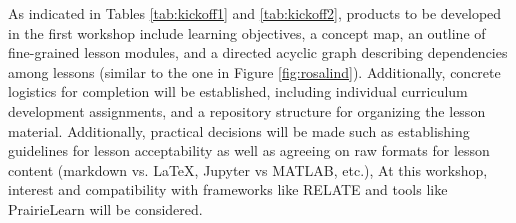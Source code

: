 \documentclass[11pt]{article}
\begin{document}
          As indicated in Tables \ref{tab:kickoff1} and \ref{tab:kickoff2}, products to be developed in 
          the first workshop include learning 
          objectives\cite{bloom_bloom_1984}, a concept 
          map\cite{novak_concept_1990}, 
          an outline of fine-grained lesson modules, and a 
          directed acyclic graph describing dependencies among lessons (similar 
          to the one in Figure \ref{fig:rosalind}). Additionally, concrete logistics 
          for completion will be established, including individual curriculum 
          development assignments, and a repository structure for organizing 
          the lesson material. Additionally, practical decisions will be made 
          such as establishing guidelines for lesson acceptability as well as 
          agreeing on raw formats for lesson content (markdown vs. \LaTeX, 
          Jupyter vs MATLAB, etc.),  At this workshop, interest and 
          compatibility with frameworks like RELATE 
          \cite{kloeckner_relate_2017,kloeckner_relate_2017-1} and tools like 
          PrairieLearn \cite{west_prairielearn:_2015} will be considered.
\end{document}
